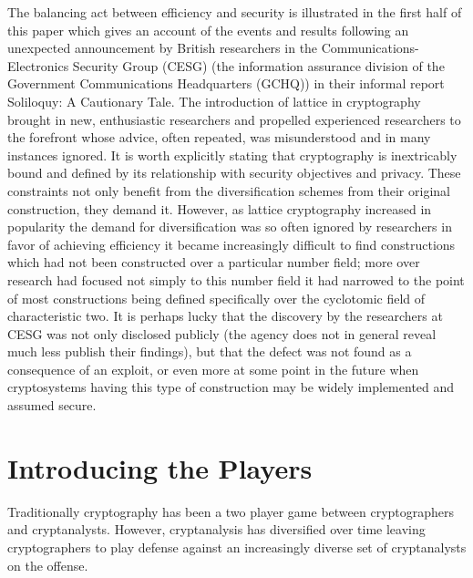 The balancing act between efficiency and security is illustrated in
the first half of this paper which gives an account of the events and
results following an unexpected announcement by British researchers in
the Communications-Electronics Security Group (CESG) (the information
assurance division of the Government Communications Headquarters
(GCHQ)) in their informal report Soliloquy: A Cautionary Tale\cite{cam20140}.
\newline
The introduction of lattice in cryptography brought in new,
enthusiastic researchers and propelled experienced researchers to the
forefront whose advice, often repeated, was misunderstood and in many instances ignored\cite{cra20151}.
\smallskip
It is worth explicitly stating that cryptography is inextricably bound and
defined by its relationship with security objectives and privacy. These
constraints not only benefit from the diversification schemes from
their original construction, they demand it.
\newline
However, as lattice cryptography increased in popularity the demand
for diversification was so often ignored by researchers in favor of
achieving efficiency it became increasingly difficult to find
constructions which had not been constructed over a particular number
field; more over research had focused not simply to this number field
it had narrowed to the point of most constructions being defined
specifically over the cyclotomic field of characteristic two\cite{cra20151}.
It is perhaps lucky that the discovery by the researchers at CESG was
not only disclosed publicly (the agency does not in general reveal much
less publish their findings), but that the defect was not found as a
consequence of an exploit, or even more at some point in the future
when cryptosystems having this type of construction may be widely
implemented and assumed secure.

\section{Introducing the Players}

Traditionally cryptography has been a two player game between
cryptographers and cryptanalysts. However, cryptanalysis has
diversified over time leaving cryptographers to play defense against an
increasingly diverse set of cryptanalysts on the offense.


